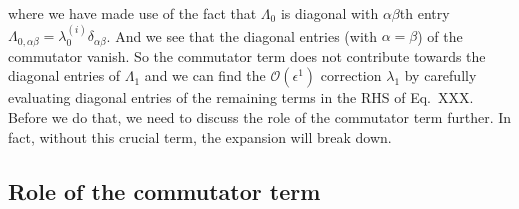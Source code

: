 %
where we have made use of the fact that $\Lambda_{0}$ is diagonal with $\alpha\beta$th entry $\Lambda_{0,\alpha\beta} = \lambda_{0}^{(i)}\delta_{\alpha\beta}$.
And we see that the diagonal entries (with $\alpha=\beta$) of the commutator vanish.
So the commutator term does not contribute towards the diagonal entries of $\Lambda_{1}$ and we can find the $\mathcal{O}(\epsilon^{1})$ correction $\lambda_{1}$ by carefully evaluating diagonal entries of the remaining terms in the RHS of Eq.~XXX.
Before we do that, we need to discuss the role of the commutator term further.
In fact, without this crucial term, the expansion will break down.

\subsection{Role of the commutator term}

